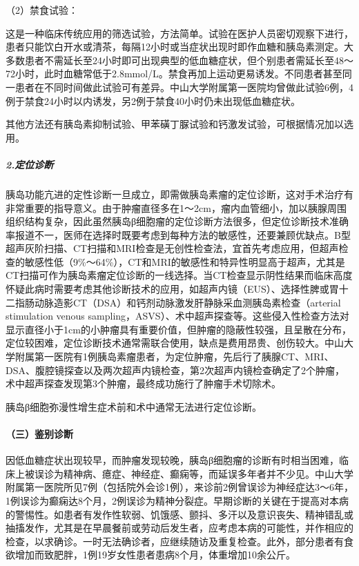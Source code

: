 \hypertarget{text00318.htmlux5cux23CHP41-1-1-1-2-1-2}{}
（2）禁食试验：

这是一种临床传统应用的筛选试验，方法简单。试验在医护人员密切观察下进行，患者只能饮白开水或清茶，每隔12小时或当症状出现时即作血糖和胰岛素测定。大多数患者不需延长至24小时即可出现典型的低血糖症状，但个别患者需延长至48～72小时，此时血糖常低于2.8mmol/L。禁食再加上运动更易诱发。不同患者甚至同一患者在不同时间做此试验可有差异。中山大学附属第一医院均曾做此试验6例，4例于禁食24小时以内诱发，另2例于禁食40小时仍未出现低血糖症状。

其他方法还有胰岛素抑制试验、甲苯磺丁脲试验和钙激发试验，可根据情况加以选用。

\subparagraph{2.定位诊断}

胰岛功能亢进的定性诊断一旦成立，即需做胰岛素瘤的定位诊断，这对手术治疗有非常重要的指导意义。由于肿瘤直径多在1～2cm，瘤内血管细小，加以胰腺周围组织结构复杂，因此虽然胰岛β细胞瘤的定位诊断方法很多，但定位诊断技术准确率报道不一，医师在选择时既要考虑到每种方法的敏感性，还要兼顾优缺点。B型超声灰阶扫描、CT扫描和MRI检查是无创性检查法，宜首先考虑应用，但超声检查的敏感性低（9\%～64\%），CT和MRI的敏感性和特异性明显高于超声，尤其是CT扫描可作为胰岛素瘤定位诊断的一线选择。当CT检查显示阴性结果而临床高度怀疑此病时需要考虑其他诊断技术的应用，如超声内镜（EUS）、选择性脾或胃十二指肠动脉造影CT（DSA）和钙剂动脉激发肝静脉采血测胰岛素检查（arterial
stimulation venous
sampling，ASVS）、术中超声探查等。这些侵入性检查方法对显示直径小于1cm的小肿瘤具有重要价值，但肿瘤的隐蔽性较强，且呈散在分布，定位较困难，定位诊断技术通常需联合使用，缺点是费用昂贵、创伤较大。中山大学附属第一医院有1例胰岛素瘤患者，为定位肿瘤，先后行了胰腺CT、MRI、DSA、腹腔镜探查以及两次超声内镜检查，第2次超声内镜检查确定了2个肿瘤，术中超声探查发现第3个肿瘤，最终成功施行了肿瘤手术切除术。

胰岛β细胞弥漫性增生症术前和术中通常无法进行定位诊断。

\paragraph{（三）鉴别诊断}

因低血糖症状出现较早，而肿瘤发现较晚，胰岛β细胞瘤的诊断有时相当困难，临床上被误诊为精神病、癔症、神经症、癫痫等，而延误多年者并不少见。中山大学附属第一医院所见7例（包括院外会诊1例），来诊前2例曾误诊为神经症达3～6年，1例误诊为癫痫达8个月，2例误诊为精神分裂症。早期诊断的关键在于提高对本病的警惕性。如患者有发作性软弱、饥饿感、颤抖、多汗以及意识丧失、精神错乱或抽搐发作，尤其是在早晨餐前或劳动后发生者，应考虑本病的可能性，并作相应的检查，以求确诊。一时无法确诊者，应继续随访及重复检查。此外，部分患者有食欲增加而致肥胖，1例19岁女性患者患病8个月，体重增加10余公斤。

